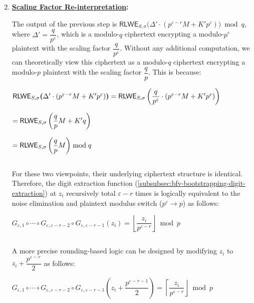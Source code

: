 \begin{tcolorbox}[title={\textbf{\tboxlabel{\ref*{subsubsec:bfv-bootstrapping-summary}} BFV Bootstrapping}}]
\begin{enumerate}
$ $

\item \textbf{\underline{Scaling Factor Re-interpretation}:}

The output of the previous step is $\textsf{RLWE}_{S, \sigma}\bm(\Delta' \cdot (p^{\varepsilon-r}M + K'p^\varepsilon) \bm) \bmod q$, where $\Delta' = \dfrac{q}{p^\varepsilon}$, which is a modulo-$q$ ciphertext encrypting a modulo-$p^\varepsilon$ plaintext with the scaling factor $\dfrac{q}{p^\varepsilon}$. Without any additional computation, we can theoretically view this ciphertext as a modulo-$q$ ciphertext encrypting a modulo-$p$ plaintext with the scaling factor $\dfrac{q}{p}$. This is because: 

$\textsf{RLWE}_{S, \sigma}\bm(\Delta' \cdot (p^{\varepsilon-r}M + K'p^\varepsilon) \bm) = \textsf{RLWE}_{S, \sigma}\bm\left(\dfrac{q}{p^\varepsilon} \cdot (p^{\varepsilon-r}M + K'p^\varepsilon) \bm\right)$

$ = \textsf{RLWE}_{S, \sigma}\bm\left(\dfrac{q}{p}M + K'q \bm\right)$

$ = \textsf{RLWE}_{S, \sigma}\bm\left(\dfrac{q}{p}M \bm\right) \bmod q$

$ $

For these two viewpoints, their underlying ciphertext structure is identical. Therefore, the digit extraction function (\autoref{subsubsec:bfv-bootstrapping-digit-extraction}) at $z_i$ recursively total $\varepsilon-r$ times is logically equivalent to the noise elimination and plaintext modulus switch ($p^\varepsilon \rightarrow p$) as follows:

$G_{\varepsilon,1} \circ \cdots \circ G_{\varepsilon,\varepsilon-r-2} \circ G_{\varepsilon,\varepsilon-r-1}(z_i) = \left\lfloor \dfrac{z_i}{p^{\varepsilon-r}} \right\rfloor \bmod p$ 

$ $

A more precise rounding-based logic can be designed by modifying $z_i$ to $z_i + \dfrac{p^{\varepsilon-r}}{2}$ as follows:


$G_{\varepsilon,1} \circ \cdots \circ G_{\varepsilon,\varepsilon-r-2} \circ G_{\varepsilon,\varepsilon-r-1}\left(z_i + \dfrac{p^{\varepsilon-r-1}}{2}\right) = \left\lceil \dfrac{z_i}{p^{\varepsilon-r}} \right\rfloor \bmod p$


\end{enumerate}



\end{tcolorbox}

